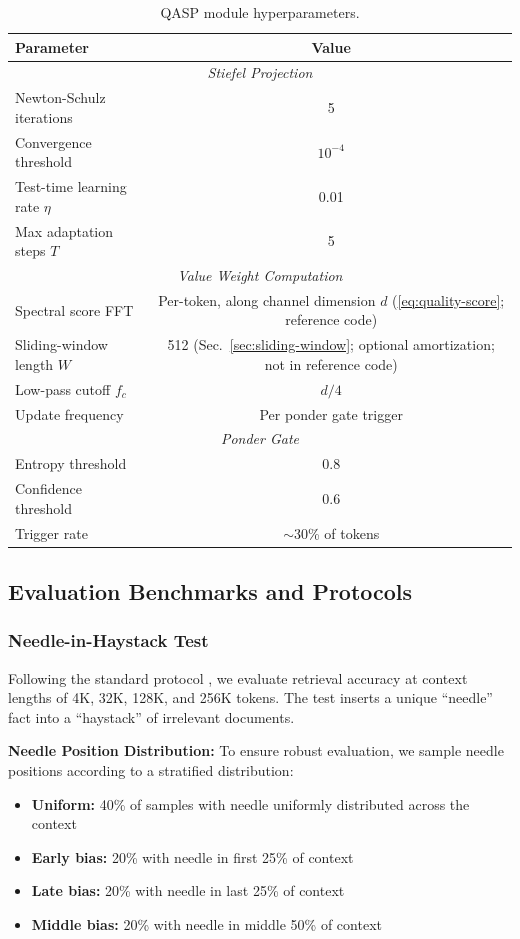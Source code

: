 \documentclass[twocolumn]{article}
\begin{document}
\begin{table}[htbp]
\centering
\caption{QASP module hyperparameters.}
\label{tab:qasp-params}
\begin{tabular}{lc}
\toprule
\textbf{Parameter} & \textbf{Value} \\
\midrule
\multicolumn{2}{c}{\textit{Stiefel Projection}} \\
Newton-Schulz iterations & 5 \\
Convergence threshold & $10^{-4}$ \\
Test-time learning rate $\eta$ & 0.01 \\
Max adaptation steps $T$ & 5 \\
\midrule
\multicolumn{2}{c}{\textit{Value Weight Computation}} \\
Spectral score FFT & Per-token, along channel dimension $d$ (\eqref{eq:quality-score}; reference code) \\
Sliding-window length $W$ & 512 (Sec.~\ref{sec:sliding-window}; optional amortization; not in reference code) \\
Low-pass cutoff $f_c$ & $d/4$ \\
Update frequency & Per ponder gate trigger \\
\midrule
\multicolumn{2}{c}{\textit{Ponder Gate}} \\
Entropy threshold & 0.8 \\
Confidence threshold & 0.6 \\
Trigger rate & $\sim$30\% of tokens \\
\bottomrule
\end{tabular}
\end{table}

\subsection{Evaluation Benchmarks and Protocols}

\subsubsection{Needle-in-Haystack Test}

Following the standard protocol \cite{needle}, we evaluate retrieval accuracy at context lengths of 4K, 32K, 128K, and 256K tokens. The test inserts a unique ``needle'' fact into a ``haystack'' of irrelevant documents.

\textbf{Needle Position Distribution:} To ensure robust evaluation, we sample needle positions according to a stratified distribution:
\begin{itemize}
    \item \textbf{Uniform:} 40\% of samples with needle uniformly distributed across the context
    \item \textbf{Early bias:} 20\% with needle in first 25\% of context
    \item \textbf{Late bias:} 20\% with needle in last 25\% of context
    \item \textbf{Middle bias:} 20\% with needle in middle 50\% of context
\end{itemize}
\end{document}
